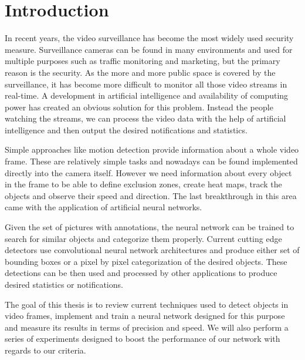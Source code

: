 \chapter*{Introduction}

In recent years, the video surveillance has become the most widely used security measure. Surveillance cameras can be found in many environments and used for multiple purposes such as traffic monitoring and marketing, but the primary reason is the security. As the more and more public space is covered by the surveillance, it has become more difficult to monitor all those video streams in real-time. A development in artificial intelligence and availability of computing power has created an obvious solution for this problem. Instead the people watching the streams, we can process the video data with the help of artificial intelligence and then output the desired notifications and statistics. 

Simple approaches like motion detection provide information about a whole video frame. These are relatively simple tasks and nowadays can be found implemented directly into the camera itself. However we need information about every object in the frame to be able to define exclusion zones, create heat maps, track the objects and observe their speed and direction. The last breakthrough in this area came with the application of artificial neural networks.

Given the set of pictures with annotations, the neural network can be trained to search for similar objects and categorize them properly. Current cutting edge detectors use convolutional neural network architectures and produce either set of bounding boxes or a pixel by pixel categorization of the desired objects. These detections can be then used and processed by other applications to produce desired statistics or notifications. 

The goal of this thesis is to review current techniques used to detect objects in video frames, implement and train a neural network designed for this purpose and measure its results in terms of precision and speed. We will also perform a series of experiments designed to boost the performance of our network with regards to our criteria. 




